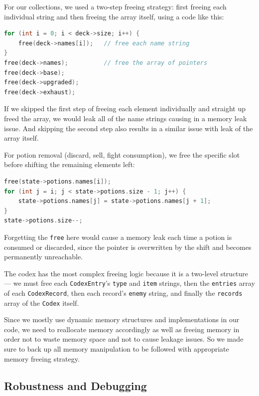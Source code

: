 \documentclass[12pt,a4paper]{article}
\begin{document}
For our collections, we used a two-step freeing strategy: first freeing each individual string and then freeing the array itself, using a code like this:

\begin{lstlisting}[language=C]
for (int i = 0; i < deck->size; i++) {
    free(deck->names[i]);   // free each name string
}
free(deck->names);          // free the array of pointers
free(deck->base);
free(deck->upgraded);
free(deck->exhaust);
\end{lstlisting}

If we skipped the first step of freeing each element individually and straight up freed the array, we would leak all of the name strings causing in a memory leak issue. And skipping the second step also results in a similar issue with leak of the array itself.

For potion removal (discard, sell, fight consumption), we free the specific slot before shifting the remaining elements left:

\begin{lstlisting}[language=C]
free(state->potions.names[i]);
for (int j = i; j < state->potions.size - 1; j++) {
    state->potions.names[j] = state->potions.names[j + 1];
}
state->potions.size--;
\end{lstlisting}

Forgetting the \texttt{free} here would cause a memory leak each time a potion is consumed or discarded, since the pointer is overwritten by the shift and becomes permanently unreachable.

The codex has the most complex freeing logic because it is a two-level structure --- we must free each \texttt{CodexEntry}'s \texttt{type} and \texttt{item} strings, then the \texttt{entries} array of each \texttt{CodexRecord}, then each record's \texttt{enemy} string, and finally the \texttt{records} array of the \texttt{Codex} itself.

Since we mostly use dynamic memory structures and implementations in our code, we need to reallocate memory accordingly as well as freeing memory in order not to waste memory space and not to cause leakage issues. So we made sure to back up all memory manipulation to be followed with appropriate memory freeing strategy.

\subsection{Robustness and Debugging}
\end{document}
